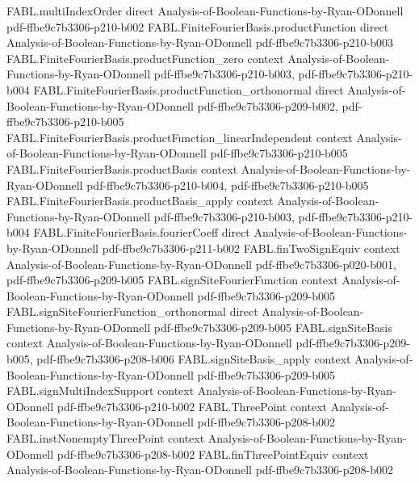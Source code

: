\begin{theorem}
\proofstep
  {FABL.multiIndexOrder}
  {direct}
  {Analysis-of-Boolean-Functions-by-Ryan-ODonnell}
  {pdf-ffbe9c7b3306-p210-b002}
\proofstep
  {FABL.FiniteFourierBasis.productFunction}
  {direct}
  {Analysis-of-Boolean-Functions-by-Ryan-ODonnell}
  {pdf-ffbe9c7b3306-p210-b003}
\proofstep
  {FABL.FiniteFourierBasis.productFunction_zero}
  {context}
  {Analysis-of-Boolean-Functions-by-Ryan-ODonnell}
  {pdf-ffbe9c7b3306-p210-b003,
    pdf-ffbe9c7b3306-p210-b004}
\proofstep
  {FABL.FiniteFourierBasis.productFunction_orthonormal}
  {direct}
  {Analysis-of-Boolean-Functions-by-Ryan-ODonnell}
  {pdf-ffbe9c7b3306-p209-b002,
    pdf-ffbe9c7b3306-p210-b005}
\proofstep
  {FABL.FiniteFourierBasis.productFunction_linearIndependent}
  {context}
  {Analysis-of-Boolean-Functions-by-Ryan-ODonnell}
  {pdf-ffbe9c7b3306-p210-b005}
\proofstep
  {FABL.FiniteFourierBasis.productBasis}
  {context}
  {Analysis-of-Boolean-Functions-by-Ryan-ODonnell}
  {pdf-ffbe9c7b3306-p210-b004,
    pdf-ffbe9c7b3306-p210-b005}
\proofstep
  {FABL.FiniteFourierBasis.productBasis_apply}
  {context}
  {Analysis-of-Boolean-Functions-by-Ryan-ODonnell}
  {pdf-ffbe9c7b3306-p210-b003,
    pdf-ffbe9c7b3306-p210-b004}
\proofstep
  {FABL.FiniteFourierBasis.fourierCoeff}
  {direct}
  {Analysis-of-Boolean-Functions-by-Ryan-ODonnell}
  {pdf-ffbe9c7b3306-p211-b002}
\proofstep
  {FABL.finTwoSignEquiv}
  {context}
  {Analysis-of-Boolean-Functions-by-Ryan-ODonnell}
  {pdf-ffbe9c7b3306-p020-b001,
    pdf-ffbe9c7b3306-p209-b005}
\proofstep
  {FABL.signSiteFourierFunction}
  {context}
  {Analysis-of-Boolean-Functions-by-Ryan-ODonnell}
  {pdf-ffbe9c7b3306-p209-b005}
\proofstep
  {FABL.signSiteFourierFunction_orthonormal}
  {direct}
  {Analysis-of-Boolean-Functions-by-Ryan-ODonnell}
  {pdf-ffbe9c7b3306-p209-b005}
\proofstep
  {FABL.signSiteBasis}
  {context}
  {Analysis-of-Boolean-Functions-by-Ryan-ODonnell}
  {pdf-ffbe9c7b3306-p209-b005,
    pdf-ffbe9c7b3306-p208-b006}
\proofstep
  {FABL.signSiteBasis_apply}
  {context}
  {Analysis-of-Boolean-Functions-by-Ryan-ODonnell}
  {pdf-ffbe9c7b3306-p209-b005}
\proofstep
  {FABL.signMultiIndexSupport}
  {context}
  {Analysis-of-Boolean-Functions-by-Ryan-ODonnell}
  {pdf-ffbe9c7b3306-p210-b002}
\proofstep
  {FABL.ThreePoint}
  {context}
  {Analysis-of-Boolean-Functions-by-Ryan-ODonnell}
  {pdf-ffbe9c7b3306-p208-b002}
\proofstep
  {FABL.instNonemptyThreePoint}
  {context}
  {Analysis-of-Boolean-Functions-by-Ryan-ODonnell}
  {pdf-ffbe9c7b3306-p208-b002}
\proofstep
  {FABL.finThreePointEquiv}
  {context}
  {Analysis-of-Boolean-Functions-by-Ryan-ODonnell}
  {pdf-ffbe9c7b3306-p208-b002}

\end{theorem}

